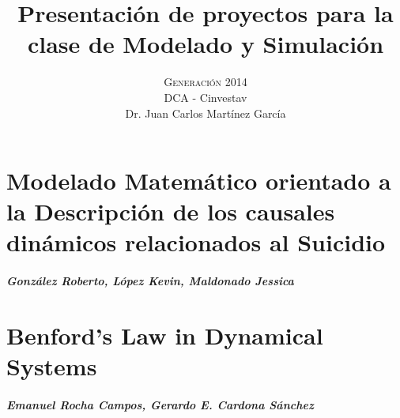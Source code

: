 



\title{\vspace{-15mm}\fontsize{24pt}{10pt}\selectfont\textbf{Presentación de proyectos para la clase de Modelado y Simulación}} %

\author{
\large \textsc{Generación 2014}\\[2mm] %
\normalsize DCA - Cinvestav \\ %
\normalsize Dr. Juan Carlos Martínez García %
\vspace{-5mm}
}
\date{}




    \maketitle %
    \thispagestyle{fancy} %
    \tableofcontents


    \chapter{Modelado Matemático orientado a la Descripción de los causales dinámicos relacionados al Suicidio}
    \paragraph{González Roberto, López Kevin, Maldonado Jessica}
    

    \chapter{Benford's Law in Dynamical Systems}
    \paragraph{Emanuel Rocha Campos, Gerardo E. Cardona Sánchez}
    

